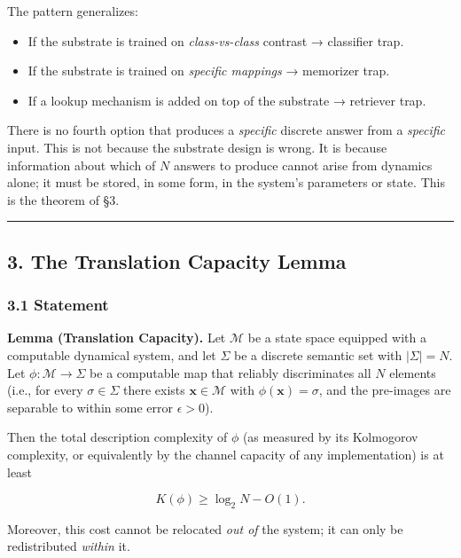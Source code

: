 \documentclass[
  11pt,
  a4paper,
]{article}
\providecommand{\tightlist}{%
  \setlength{\itemsep}{0pt}\setlength{\parskip}{0pt}}
\begin{document}
The pattern generalizes:

\begin{itemize}
\tightlist
\item
  If the substrate is trained on \emph{class-vs-class} contrast →
  classifier trap.
\item
  If the substrate is trained on \emph{specific mappings} → memorizer
  trap.
\item
  If a lookup mechanism is added on top of the substrate → retriever
  trap.
\end{itemize}

There is no fourth option that produces a \emph{specific} discrete
answer from a \emph{specific} input. This is not because the substrate
design is wrong. It is because information about which of \(N\) answers
to produce cannot arise from dynamics alone; it must be stored, in some
form, in the system's parameters or state. This is the theorem of §3.

\begin{center}\rule{0.5\linewidth}{0.5pt}\end{center}

\subsection{3. The Translation Capacity
Lemma}\label{the-translation-capacity-lemma}

\subsubsection{3.1 Statement}\label{statement}

\textbf{Lemma (Translation Capacity).} Let \(\mathcal{M}\) be a state
space equipped with a computable dynamical system, and let \(\Sigma\) be
a discrete semantic set with \(|\Sigma| = N\). Let
\(\phi: \mathcal{M} \to \Sigma\) be a computable map that reliably
discriminates all \(N\) elements (i.e., for every \(\sigma \in \Sigma\)
there exists \(\mathbf{x} \in \mathcal{M}\) with
\(\phi(\mathbf{x}) = \sigma\), and the pre-images are separable to
within some error \(\epsilon > 0\)).

Then the total description complexity of \(\phi\) (as measured by its
Kolmogorov complexity, or equivalently by the channel capacity of any
implementation) is at least

\[
K(\phi) \geq \log_2 N - O(1).
\]

Moreover, this cost cannot be relocated \emph{out of} the system; it can
only be redistributed \emph{within} it.
\end{document}
